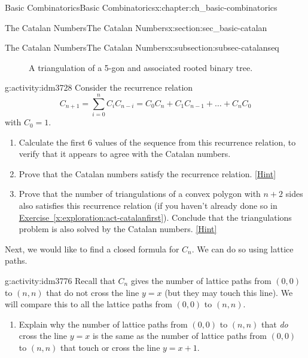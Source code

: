 \documentclass[oneside,10pt,]{book}
\numberwithin{equation}{chapter}
\newcommand{\vtx}[2]{node[fill,circle,inner sep=0pt, minimum size=4pt,label=#1:#2]{}}
\newcommand{\va}[1]{\vtx{above}{#1}}
\renewcommand{\v}{\vtx{above}{}}
\begin{document}
\begin{chapterptx}{Basic Combinatorics}{}{Basic Combinatorics}{}{}{x:chapter:ch_basic-combinatorics}
\begin{sectionptx}{The Catalan Numbers}{}{The Catalan Numbers}{}{}{x:section:sec_basic-catalan}
\begin{subsectionptx}{The Catalan Numbers}{}{The Catalan Numbers}{}{}{x:subsection:subsec-catalanseq}
\begin{figure}
\begin{sidebyside}{2}{0.125}{0.125}{0.25}
\begin{sbspanel}{0.25}
        \end{sbspanel}%
\end{sidebyside}%
\caption{A triangulation of a 5-gon and associated rooted binary tree.\label{x:figure:fig-triangulationtree}}
\end{figure}
\begin{activity}{}{g:activity:idm3728}%
Consider the recurrence relation%
\begin{equation*}
C_{n + 1} = \sum_{i = 0}^n C_iC_{n-i} = C_{0}C_{n} + C_{1}C_{n - 1} + \ldots + C_{n}C_{0}
\end{equation*}
with \(C_0 = 1\).%
\begin{enumerate}[font=\bfseries,label=(\alph*),ref=\alph*]
\item{}Calculate the first 6 values of the sequence from this recurrence relation, to verify that it appears to agree with the Catalan numbers.%
\item{}Prove that the Catalan numbers satisfy the recurrence relation.%
\space\hspace*{0pt}\hfill{\tiny\hyperlink{g:hint:idm3741-back}{[Hint]}}\item{}Prove that the number of triangulations of a convex polygon with \(n+2\) sides also satisfies this recurrence relation (if you haven't already done so in \hyperref[x:exploration:act-catalanfirst]{Exercise~\ref{x:exploration:act-catalanfirst}}).  Conclude that the triangulations problem is also solved by the Catalan numbers.%
\space\hspace*{0pt}\hfill{\tiny\hyperlink{g:hint:idm3766-back}{[Hint]}}\end{enumerate}
\end{activity}
Next, we would like to find a closed formula for \(C_n\).  We can do so using lattice paths.%
\begin{activity}{}{g:activity:idm3776}%
Recall that \(C_n\) gives the number of lattice paths from \((0,0)\) to \((n,n)\) that do not cross the line \(y = x\) (but they may touch this line).  We will compare this to all the lattice paths from \((0,0)\) to \((n,n)\).%
\begin{enumerate}[font=\bfseries,label=(\alph*),ref=\alph*]
\item{}Explain why the number of lattice paths from \((0,0)\) to \((n,n)\) that \emph{do} cross the line \(y = x\) is the same as the number of lattice paths from \((0,0)\) to \((n,n)\) that touch or cross the line \(y = x + 1\).%

\end{enumerate}
\end{activity}
\end{subsectionptx}
\end{sectionptx}
\end{chapterptx}
\end{document}
